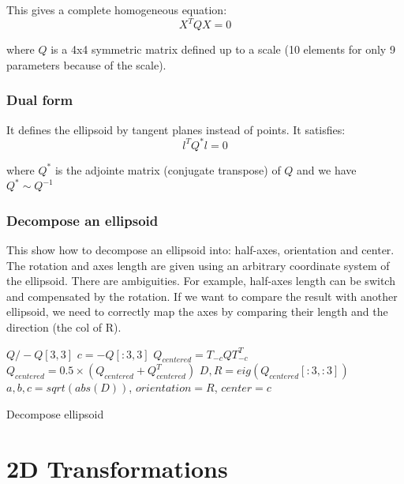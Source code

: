 This gives a complete homogeneous equation:
\begin{equation}
    X^T Q X = 0
\end{equation}

where $Q$ is a 4x4 symmetric matrix defined up to a scale (10 elements for only 9 parameters because of the scale).

\subsubsection{Dual form}
It defines the ellipsoid by tangent planes instead of points. It satisfies:
\begin{equation}
    l^T Q^* l = 0
\end{equation}

where $Q^*$ is the adjointe matrix (conjugate transpose) of $Q$ and we have $Q^* \sim Q^{-1}$


\subsubsection{Decompose an ellipsoid}
This show how to decompose an ellipsoid into: half-axes, orientation and center. The rotation and axes length are given using an arbitrary coordinate system of the ellipsoid. There are ambiguities. For example, half-axes length can be switch and compensated by the rotation. If we want to compare the result with another ellipsoid, we need to correctly map the axes by comparing their length and the direction (the col of R).

\begin{algorithm}[H]
\DontPrintSemicolon
{}
 $Q/-Q[3, 3]$ 
 $c = -Q[:3, 3]$  
 $Q_{centered} = T_{-c} Q T_{-c}^T $ 
 $Q_{centered} = 0.5\times(Q_{centered}+Q_{centered}^T)$ 
 $D, R = eig(Q_{centered}[:3, :3])$ 
 $a, b, c = sqrt(abs(D))$, $orientation = R$, $center = c$
\caption{Decompose ellipsoid}
\end{algorithm}

\section{2D Transformations}

